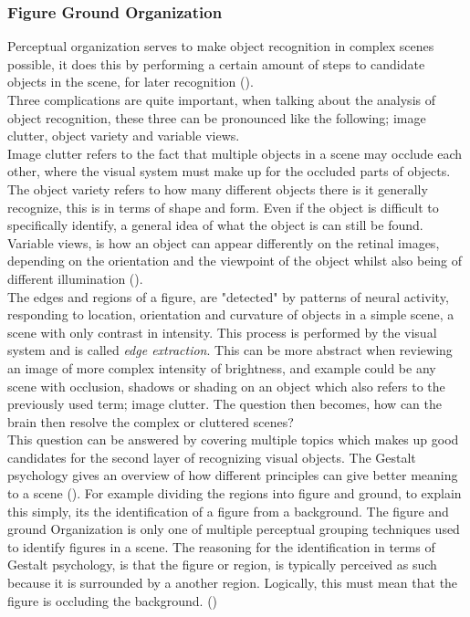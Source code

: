 \documentclass{article}
\newcommand{\goodcite}[1]{ {(\cite{#1})}}
\begin{document}
\subsubsection{Figure Ground Organization}
\label{sec:perceptialorganization}
Perceptual organization serves to make object recognition in complex scenes possible, it does this by performing a certain amount of steps to candidate objects in the scene, for later recognition\goodcite{hsp}.\\
Three complications are quite important, when talking about the analysis of object recognition, these three can be pronounced like the following; image clutter, object variety and variable views.\\
Image clutter refers to the fact that multiple objects in a scene may occlude each other, where the visual system must make up for the occluded parts of objects. The object variety refers to how many different objects there is it generally recognize, this is in terms of shape and form. Even if the object is difficult to specifically identify, a general idea of what the object is can still be found. Variable views, is how an object can appear differently on the retinal images, depending on the orientation and the viewpoint of the object whilst also being of different illumination\goodcite{hsp}.\\

The edges and regions of a figure, are "detected" by patterns of neural activity, responding to location, orientation and curvature of objects in a simple scene, a scene with only contrast in intensity. This process is performed by the visual system and is called \textit{edge extraction}. This can be more abstract when reviewing an image of more complex intensity of brightness, and example could be any scene with occlusion, shadows or shading on an object which also refers to the previously used term; image clutter. The question then becomes, how can the brain then resolve the complex or cluttered scenes?\\

This question can be answered by covering multiple topics which makes up good candidates for the second layer of recognizing visual objects. The Gestalt psychology gives an overview of how different principles can give better meaning to a scene\goodcite{hsp}. For example dividing the regions into figure and ground, to explain this simply, its the identification of a figure from a background. The figure and ground Organization is only one of multiple perceptual grouping techniques used to identify figures in a scene. The reasoning for the identification in terms of Gestalt psychology, is that the figure or region, is typically perceived as such because it is surrounded by a another region. Logically, this must mean that the figure is occluding the background.\goodcite{hsp}\\
\end{document}
